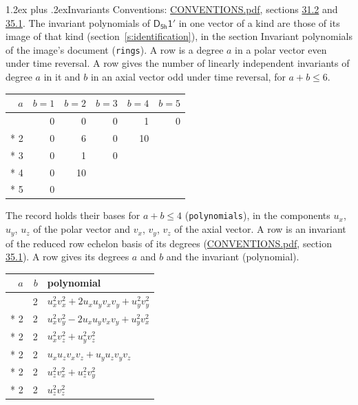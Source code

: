 \documentclass[10pt,a4paper]{article}
\makeatletter
\renewcommand\section{\@startsection{section}{1}{\z@}{-3ex plus -1ex minus -.2ex}%
  {1.2ex plus .2ex}{\normalfont\large\sffamily\bfseries\color{parttitle}}}
\numberwithin{equation}{section}
\newcommand{\grp}[1]{\mathsf{#1}}
\makeatother
\begin{document}
\section{Invariants}\label{s:invariants}
Conventions: \href{../../CONVENTIONS.pdf}{CONVENTIONS.pdf}, sections \href{../../CONVENTIONS.pdf\#conv.31.2}{31.2} and \href{../../CONVENTIONS.pdf\#conv.35.1}{35.1}.
The invariant polynomials of $\grp{D_{5h}1'}$ in one vector of a kind are those of its image of that kind (section~\ref{s:identification}), in the section Invariant polynomials of the image's document (\texttt{rings}).
\leavevmode\label{n:index.degree.polar}\label{n:index.degree.axial}A row is a degree $a$ in a polar vector even under time reversal. A row gives the number of linearly independent invariants of degree $a$ in it and $b$ in an axial vector odd under time reversal, for $a + b \le 6$.
{\small\begin{longtable}{@{}rrrrrr@{}}\toprule
$a$ & $b = 1$ & $b = 2$ & $b = 3$ & $b = 4$ & $b = 5$\\\midrule\endhead
\bottomrule\endfoot\endlastfoot
1 & 0 & 0 & 0 & 1 & 0\\*
2 & 0 & 6 & 0 & 10 & \\*
3 & 0 & 1 & 0 &  & \\*
4 & 0 & 10 &  &  & \\*
5 & 0 &  &  &  & \\
\bottomrule\end{longtable}}
\leavevmode\label{n:local.component.polar}\label{n:local.component.axial}The record holds their bases for $a + b \le 4$ (\texttt{polynomials}), in the components $u_{x}$, $u_{y}$, $u_{z}$ of the polar vector and $v_{x}$, $v_{y}$, $v_{z}$ of the axial vector. \label{n:head.polynomial}A row is an invariant of the reduced row echelon basis of its degrees (\href{../../CONVENTIONS.pdf}{CONVENTIONS.pdf}, section \href{../../CONVENTIONS.pdf\#conv.35.1}{35.1}). A row gives its degrees $a$ and $b$ and the invariant (polynomial).
{\small\renewcommand{\arraystretch}{1.2}\begin{longtable}{@{}rrl@{}}\toprule
$a$ & $b$ & polynomial\\\midrule\endhead
\bottomrule\endfoot\endlastfoot
2 & 2 & $u_{x}^{2}v_{x}^{2} + 2u_{x}u_{y}v_{x}v_{y} + u_{y}^{2}v_{y}^{2}$\\*
2 & 2 & $u_{x}^{2}v_{y}^{2} - 2u_{x}u_{y}v_{x}v_{y} + u_{y}^{2}v_{x}^{2}$\\*
2 & 2 & $u_{x}^{2}v_{z}^{2} + u_{y}^{2}v_{z}^{2}$\\*
2 & 2 & $u_{x}u_{z}v_{x}v_{z} + u_{y}u_{z}v_{y}v_{z}$\\*
2 & 2 & $u_{z}^{2}v_{x}^{2} + u_{z}^{2}v_{y}^{2}$\\*
2 & 2 & $u_{z}^{2}v_{z}^{2}$\\
\bottomrule\end{longtable}}
\end{document}
